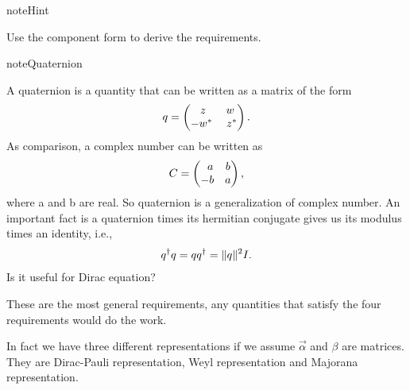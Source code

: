\documentclass[letterpaper,12pt,english]{sphinxmanual}
\begin{document}
\begin{notice}{note}{Hint}

Use the component form to derive the requirements.
\end{notice}

\begin{notice}{note}{Quaternion}

A quaternion is a quantity that can be written as a matrix of the form
\begin{gather}
\begin{split}q = \begin{pmatrix}\;z & w \\ -w^* & \;z^*\end{pmatrix}.\end{split}\notag
\end{gather}
As comparison, a complex number can be written as
\begin{gather}
\begin{split}C = \begin{pmatrix}\;\; a &   b  \\- b &  a
\end{pmatrix},\end{split}\notag
\end{gather}
where a and b are real. So quaternion is a generalization of complex number. An important fact is a quaternion times its hermitian conjugate gives us its modulus times an identity, i.e.,
\begin{gather}
\begin{split}q^\dagger q= q q^\dagger = \| q \|^2 I.\end{split}\notag
\end{gather}
Is it useful for Dirac equation?
\end{notice}

These are the most general requirements, any quantities that satisfy the four requirements would do the work.

In fact we have three different representations if we assume \(\vec\alpha\) and \(\beta\) are matrices. They are Dirac-Pauli representation, Weyl representation and Majorana representation.
\end{document}
